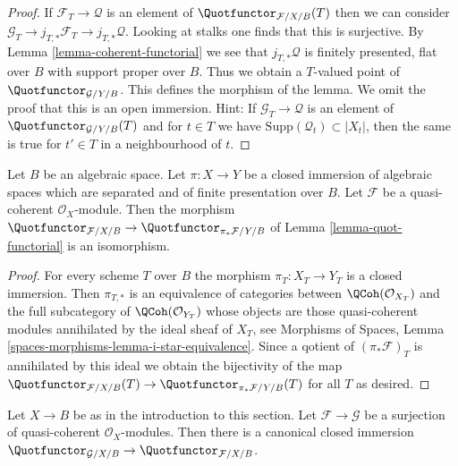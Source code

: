 \begin{proof}
If $\mathcal{F}_T \to \mathcal{Q}$ is an element of
$\Quotfunctor_{\mathcal{F}/X/B}(T)$ then we can consider
$\mathcal{G}_T \to j_{T, *}\mathcal{F}_T \to j_{T, *}\mathcal{Q}$.
Looking at stalks one finds that this is surjective.
By Lemma \ref{lemma-coherent-functorial}
we see that $j_{T, *}\mathcal{Q}$ is finitely presented, flat over $B$
with support proper over $B$. Thus we obtain a $T$-valued
point of $\Quotfunctor_{\mathcal{G}/Y/B}$.
This defines the morphism of the lemma.
We omit the proof that this is an open immersion. Hint:
If $\mathcal{G}_T \to \mathcal{Q}$ is an element of
$\Quotfunctor_{\mathcal{G}/Y/B}(T)$
and for $t \in T$ we have $\text{Supp}(\mathcal{Q}_t) \subset |X_t|$,
then the same is true for $t' \in T$ in a neighbourhood of $t$.
\end{proof}

\begin{lemma}
\label{lemma-quot-closed}
Let $B$ be an algebraic space. Let $\pi : X \to Y$ be a closed immersion
of algebraic spaces which are separated and of finite presentation over $B$.
Let $\mathcal{F}$ be a quasi-coherent $\mathcal{O}_X$-module.
Then the morphism
$\Quotfunctor_{\mathcal{F}/X/B} \to \Quotfunctor_{\pi_*\mathcal{F}/Y/B}$ of
Lemma \ref{lemma-quot-functorial} is an isomorphism.
\end{lemma}

\begin{proof}
For every scheme $T$ over $B$ the morphism $\pi_T : X_T \to Y_T$
is a closed immersion. Then $\pi_{T, *}$ is an equivalence of
categories between $\QCoh(\mathcal{O}_{X_T})$ and the full subcategory
of $\QCoh(\mathcal{O}_{Y_T})$ whose objects are those quasi-coherent
modules annihilated by the ideal sheaf of $X_T$, see
Morphisms of Spaces, Lemma \ref{spaces-morphisms-lemma-i-star-equivalence}.
Since a qotient of
$(\pi_*\mathcal{F})_T$ is annihilated by this ideal we obtain the
bijectivity of the map
$\Quotfunctor_{\mathcal{F}/X/B}(T) \to \Quotfunctor_{\pi_*\mathcal{F}/Y/B}(T)$
for all $T$ as desired.
\end{proof}

\begin{lemma}
\label{lemma-quot-quotient}
Let $X \to B$ be as in the introduction to this section. Let
$\mathcal{F} \to \mathcal{G}$ be a surjection of quasi-coherent
$\mathcal{O}_X$-modules. Then there is a canonical closed immersion
$\Quotfunctor_{\mathcal{G}/X/B} \to \Quotfunctor_{\mathcal{F}/X/B}$.
\end{lemma}

